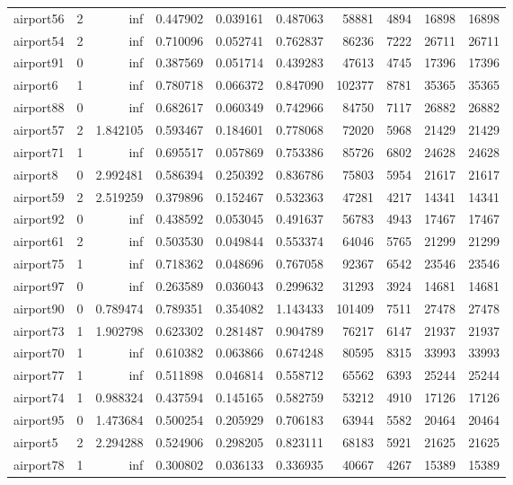 \documentclass[../../../thesis.tex]{subfiles}
\begin{document}
\begin{longtable}{|l|r|r|r|r|r|r|r|r|r|}
airport56 & 2 & inf & 0.447902 & 0.039161 & 0.487063 & 58881 & 4894 & 16898 & 16898 \\
airport54 & 2 & inf & 0.710096 & 0.052741 & 0.762837 & 86236 & 7222 & 26711 & 26711 \\
airport91 & 0 & inf & 0.387569 & 0.051714 & 0.439283 & 47613 & 4745 & 17396 & 17396 \\
airport6 & 1 & inf & 0.780718 & 0.066372 & 0.847090 & 102377 & 8781 & 35365 & 35365 \\
airport88 & 0 & inf & 0.682617 & 0.060349 & 0.742966 & 84750 & 7117 & 26882 & 26882 \\
airport57 & 2 & 1.842105 & 0.593467 & 0.184601 & 0.778068 & 72020 & 5968 & 21429 & 21429 \\
airport71 & 1 & inf & 0.695517 & 0.057869 & 0.753386 & 85726 & 6802 & 24628 & 24628 \\
airport8 & 0 & 2.992481 & 0.586394 & 0.250392 & 0.836786 & 75803 & 5954 & 21617 & 21617 \\
airport59 & 2 & 2.519259 & 0.379896 & 0.152467 & 0.532363 & 47281 & 4217 & 14341 & 14341 \\
airport92 & 0 & inf & 0.438592 & 0.053045 & 0.491637 & 56783 & 4943 & 17467 & 17467 \\
airport61 & 2 & inf & 0.503530 & 0.049844 & 0.553374 & 64046 & 5765 & 21299 & 21299 \\
airport75 & 1 & inf & 0.718362 & 0.048696 & 0.767058 & 92367 & 6542 & 23546 & 23546 \\
airport97 & 0 & inf & 0.263589 & 0.036043 & 0.299632 & 31293 & 3924 & 14681 & 14681 \\
airport90 & 0 & 0.789474 & 0.789351 & 0.354082 & 1.143433 & 101409 & 7511 & 27478 & 27478 \\
airport73 & 1 & 1.902798 & 0.623302 & 0.281487 & 0.904789 & 76217 & 6147 & 21937 & 21937 \\
airport70 & 1 & inf & 0.610382 & 0.063866 & 0.674248 & 80595 & 8315 & 33993 & 33993 \\
airport77 & 1 & inf & 0.511898 & 0.046814 & 0.558712 & 65562 & 6393 & 25244 & 25244 \\
airport74 & 1 & 0.988324 & 0.437594 & 0.145165 & 0.582759 & 53212 & 4910 & 17126 & 17126 \\
airport95 & 0 & 1.473684 & 0.500254 & 0.205929 & 0.706183 & 63944 & 5582 & 20464 & 20464 \\
airport5 & 2 & 2.294288 & 0.524906 & 0.298205 & 0.823111 & 68183 & 5921 & 21625 & 21625 \\
airport78 & 1 & inf & 0.300802 & 0.036133 & 0.336935 & 40667 & 4267 & 15389 & 15389 \\

\end{longtable}
\end{document}
